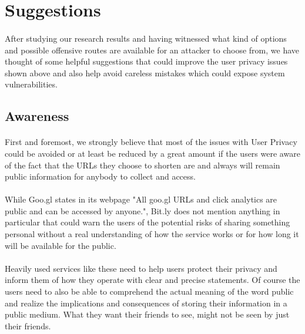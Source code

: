 \documentclass[12pt]{article}
\begin{document}
\newpage
\section{Suggestions}

\paragraph{}
 After studying our research results and having witnessed what kind of options and possible offensive routes are available for an attacker to choose from, we have thought of some helpful suggestions that could improve the user privacy issues shown above and also help avoid careless mistakes which could expose system vulnerabilities.

\subsection{Awareness}

\paragraph{}
 First and foremost, we strongly believe that most of the issues with User Privacy could be avoided or at least be reduced by a great amount if the users were aware of the fact that the URLs they choose to shorten are and always will remain public information for anybody to collect and access.
 
\paragraph{}
 While Goo.gl states in its webpage "All goo.gl URLs and click analytics are public and can be accessed by anyone.", Bit.ly does not mention anything in particular that could warn the users of the potential risks of sharing something personal without a real understanding of how the service works or for how long it will be available for the public.

\paragraph{}
 Heavily used services like these need to help users protect their privacy and inform them of how they operate with clear and precise statements. Of course the users need to also be able to comprehend the actual meaning of the word public and realize the implications and consequences of storing their information in a public medium. What they want their friends to see, might not be seen by just their friends.
\end{document}
